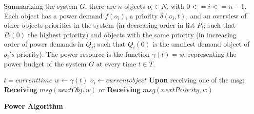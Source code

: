 \documentclass[../main/Self-Stabilization.tex]{subfiles}
\begin{document}
Summarizing the system $G$, there are $n$ objects $o_{i}\in N$, with $0<=i<=n-1$. Each object has a power demand $f(o_{i})$, a priority $\delta(o_{i}, t)$, and an overview of other objects priorities in the system (in decreasing order in list $P_{i}$; such that $P_{i}(0)$ the highest priority) and objects with the same priority (in increasing order of power demands in $Q_{i}$; such that $Q_{i}(0)$ is the smallest demand object of $o_{i}'s$ priority). The power resource is the function $\gamma(t) = w$, representing the power budget of the system $G$ at every time $t \in T$.


\LinesNumbered
\IncMargin{1em}
\begin{algorithm}
$t = current time$
\BlankLine
$w \gets \gamma(t)$ 
\BlankLine
$o_{i} \gets current object$
\BlankLine
{}
\textbf{Upon} receiving one of the msg:\newline
\textbf{Receiving} $msg(nextObj, w)$ or\newline
\textbf{Receiving} $msg(nextPriority, w)$\newline
{}
\caption{\textbf{Power Algorithm}} \label{algo2}



\end{algorithm}
\DecMargin{1em}
\end{document}
